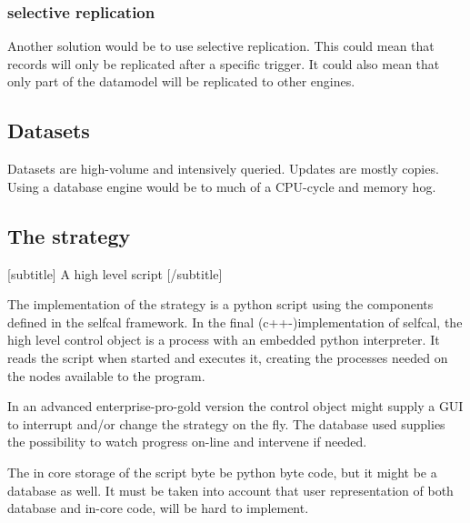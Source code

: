 \documentclass[]{lofar}
\begin{document}
\subsubsection{selective replication}
\label{id2719816}\hypertarget{id2719816}{}%



     Another solution would be to use selective replication. This could
     mean that records will only be replicated after a specific
     trigger. It could also mean that only part of the datamodel will be
     replicated to other engines.

    

\subsection{Datasets}
\label{id2720237}\hypertarget{id2720237}{}%



    Datasets are high-volume and intensively queried. Updates are
    mostly copies. Using a database engine would be to much of a
    CPU-cycle and memory hog.

   

\subsection{The strategy}
\label{id2721184}\hypertarget{id2721184}{}%
 [subtitle] 
A high level script [/subtitle] 



    The implementation of the strategy is a python script using the
    components defined in the selfcal framework. In the final
    (c++-)implementation of selfcal, the high level control object is
    a process with an embedded python interpreter. It reads the script
    when started and executes it, creating the processes needed on the
    nodes available to the program.

   



    In an advanced enterprise-pro-gold version the control object
    might supply a GUI to interrupt and/or change the strategy on the
    fly. The database used supplies the possibility to watch progress
    on-line and intervene if needed.

   



    The in core storage of the script byte be python byte code, but it
    might be a database as well. It must be taken into account that
    user representation of both database and in-core code, will be
    hard to implement.
\end{document}
